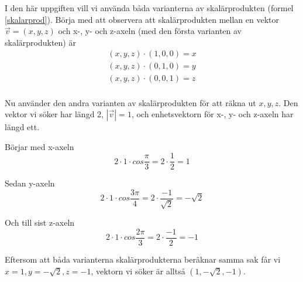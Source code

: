 \documentclass[../../main.tex]{subfiles}
\begin{document}
\begin{solution}{17}
I den här uppgiften vill vi använda båda varianterna av skalärprodukten (formel \ref{skalarprod}). Börja med att observera att skalärprodukten mellan en vektor $\Vec{v} = (x, y, z)$ och x-, y- och z-axeln (med den första varianten av skalärprodukten) är
\begin{align*}
(x, y, z) \cdot (1, 0, 0) = x\\
(x, y, z) \cdot (0, 1, 0) = y\\
(x, y, z) \cdot (0, 0, 1) = z\\
\end{align*}

Nu använder den andra varianten av skalärprodukten för att räkna ut $x, y, z$. Den vektor vi söker har längd 2, $|\Vec{v}| = 1$, och enhetsvektorn för x-, y- och z-axeln har längd ett.

Börjar med x-axeln
\[
2 \cdot 1 \cdot cos\frac{\pi}{3} = 2 \cdot \frac{1}{2} = 1
\]

Sedan y-axeln
\[2 \cdot 1 \cdot cos\frac{3\pi}{4} = 2 \cdot \frac{-1}{\sqrt{2}} = -\sqrt{2}\]

Och till sist z-axeln
\[2 \cdot 1 \cdot cos\frac{2\pi}{3} = 2 \cdot \frac{-1}{2} = -1\]

Eftersom att båda varianterna skalärprodukterna beräknar samma sak får vi $x = 1, y = -\sqrt{2}, z=-1$, vektorn vi söker är alltså $(1, -\sqrt{2}, -1)$.

\end{solution}
\end{document}
